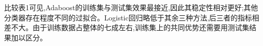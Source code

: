 比较表1可见,Adaboost的训练集与测试集效果最接近,因此其稳定性相对更好;其他分类器存在程度不同的过拟合。Logistic回归略低于其余三种方法,后三者的指标相差不大。由于训练数据占整体的七成左右,训练集上的共同优势还需要用测试集结果加以区分。
